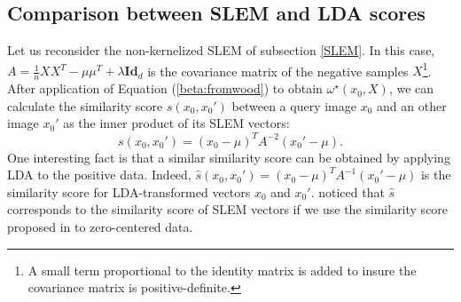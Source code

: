 \documentclass[12pt,letterpaper]{article}
\begin{document}
\subsection{Comparison between SLEM and LDA scores}
Let us reconsider the non-kernelized SLEM of subsection \ref{SLEM}. In this case, $A = \frac{1}{n}XX^T-\mu\mu^T+\lambda\textbf{Id}_d$ is the covariance matrix of the negative samples $X$\footnote{A small term proportional to the identity matrix is added to insure the covariance matrix is positive-definite.}. After application of Equation (\ref{beta:fromwood}) to obtain $\omega^\star(x_0,X)$, we can calculate the similarity score $s(x_0,x_0')$ between a query image $x_0$ and an other image $x_0'$ as the inner product of its SLEM vectors:
\begin{equation}
s(x_0,x_0') = (x_0-\mu)^TA^{-2}(x_0'-\mu).
\end{equation}
One interesting fact is that a similar similarity score can be obtained by applying LDA to the positive data. 
Indeed, $\hat{s}(x_0,x_0') = (x_0-\mu)^TA^{-1}(x_0'-\mu)$ is the similarity score for LDA-transformed vectors $x_0$ and $x_0'$. 
\cite{Koba15} noticed that $\hat{s}$ corresponds to the similarity score of SLEM vectors if we use the similarity score proposed in \cite{Efros11} to zero-centered data.
\end{document}
